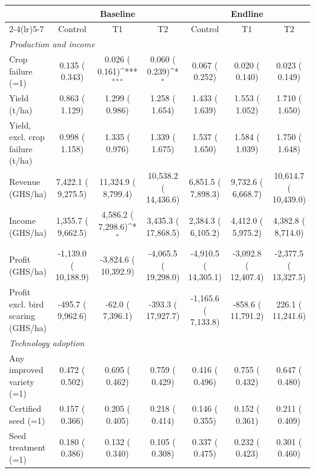 \def\sym#1{\ifmmode^{#1}\else\(^{#1}\)\fi}
\begin{tabular}{lcccccc}
\toprule
 & \multicolumn{3}{c}{Baseline} & \multicolumn{3}{c}{Endline} \\
\cmidrule(lr){2-4}\cmidrule(lr){5-7}
 & Control & T1 & T2 & Control & T1 & T2 \\
\midrule
\multicolumn{7}{l}{\textit{Production and income}}\\
Crop failure (=1) &     0.135 (    0.343) &     0.026 (    0.161)\sym{***} &     0.060 (    0.239)\sym{*} &     0.067 (    0.252) &     0.020 (    0.140) &     0.023 (    0.149) \\
Yield (t/ha) &     0.863 (    1.129) &     1.299 (    0.986) &     1.258 (    1.654) &     1.433 (    1.639) &     1.553 (    1.052) &     1.710 (    1.650) \\
\quad Yield, excl. crop failure (t/ha) &     0.998 (    1.158) &     1.335 (    0.976) &     1.339 (    1.675) &     1.537 (    1.650) &     1.584 (    1.039) &     1.750 (    1.648) \\
Revenue (GHS/ha) &      7,422.1 (     9,275.5) &     11,324.9 (     8,799.4) &     10,538.2 (    14,436.6) &      6,851.5 (     7,898.3) &      9,732.6 (     6,668.7) &     10,614.7 (    10,439.0) \\
Income (GHS/ha) &      1,355.7 (     9,662.5) &      4,586.2 (     7,298.6)\sym{*} &      3,435.3 (    17,868.5) &      2,384.3 (     6,105.2) &      4,412.0 (     5,975.2) &      4,382.8 (     8,714.0) \\
Profit (GHS/ha) &     -1,139.0 (    10,188.9) &     -3,824.6 (    10,392.9) &     -4,065.5 (    19,298.0) &     -4,910.5 (    14,305.1) &     -3,092.8 (    12,407.4) &     -2,377.5 (    13,327.5) \\
Profit excl. bird scaring (GHS/ha) &       -495.7 (     9,962.6) &        -62.0 (     7,396.1) &       -393.3 (    17,927.7) &     -1,165.6 (     7,133.8) &       -858.6 (    11,791.2) &        226.1 (    11,241.6) \\
\multicolumn{7}{l}{\textit{Technology adoption}}\\
Any improved variety (=1) &     0.472 (    0.502) &     0.695 (    0.462) &     0.759 (    0.429) &     0.416 (    0.496) &     0.755 (    0.432) &     0.647 (    0.480) \\
Certified seed (=1) &     0.157 (    0.366) &     0.205 (    0.405) &     0.218 (    0.414) &     0.146 (    0.355) &     0.152 (    0.361) &     0.211 (    0.409) \\
Seed treatment (=1) &     0.180 (    0.386) &     0.132 (    0.340) &     0.105 (    0.308) &     0.337 (    0.475) &     0.232 (    0.423) &     0.301 (    0.460) \\

\end{tabular}
